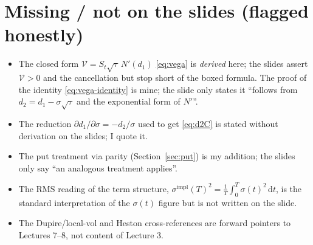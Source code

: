 \documentclass[11pt]{article}
\newcommand{\dd}{\,\mathrm{d}}
\newcommand{\impl}{\mathrm{impl}}
\newcommand{\Vega}{\mathcal{V}}
\begin{document}
\section*{Missing / not on the slides (flagged honestly)}
\begin{itemize}[nosep]
\item The closed form $\Vega=S_t\sqrt\tau\,N'(d_1)$ \eqref{eq:vega} is \emph{derived} here; the
      slides assert $\Vega>0$ and the cancellation but stop short of the boxed formula. The proof
      of the identity \eqref{eq:vega-identity} is mine; the slide only states it ``follows from
      $d_2=d_1-\sigma\sqrt\tau$ and the exponential form of $N'$''.
\item The reduction $\partial d_1/\partial\sigma=-d_2/\sigma$ used to get \eqref{eq:d2C} is stated
      without derivation on the slides; I quote it.
\item The put treatment via parity (Section~\ref{sec:put}) is my addition; the slides only say ``an
      analogous treatment applies''.
\item The RMS reading of the term structure,
      $\sigma^{\impl}(T)^2=\tfrac1T\int_0^T\sigma(t)^2\dd t$, is the standard interpretation of the
      $\sigma(t)$ figure but is not written on the slide.
\item The Dupire/local-vol and Heston cross-references are forward pointers to Lectures 7--8, not
      content of Lecture 3.
\end{itemize}
\end{document}
